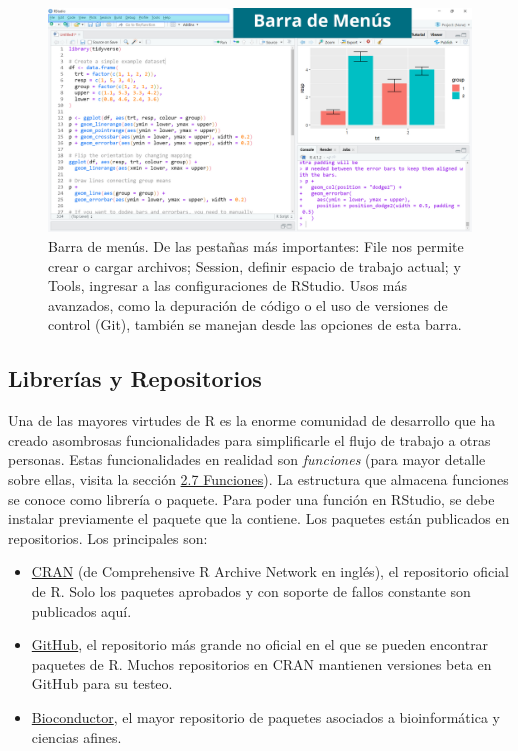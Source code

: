 \documentclass[
]{article}
\theoremstyle{definition}
\theoremstyle{definition}
\theoremstyle{definition}
\theoremstyle{definition}
\theoremstyle{remark}
\begin{document}
\begin{figure}

{\centering \includegraphics[width=1\linewidth]{figs/screenshots/Slide5} 

}

\caption{Barra de menús. De las pestañas más importantes: File nos permite crear o cargar archivos; Session, definir espacio de trabajo actual; y Tools, ingresar a las configuraciones de RStudio. Usos más avanzados, como la depuración de código o el uso de versiones de control (Git), también se manejan desde las opciones de esta barra.}\label{fig:figura18}
\end{figure}

\hypertarget{libreruxedas-y-repositorios}{%
\subsection{Librerías y Repositorios}\label{libreruxedas-y-repositorios}}

Una de las mayores virtudes de R es la enorme comunidad de desarrollo que ha creado asombrosas funcionalidades para simplificarle el flujo de trabajo a otras personas. Estas funcionalidades en realidad son \emph{funciones} (para mayor detalle sobre ellas, visita la sección \protect\hyperlink{funciones}{2.7 Funciones}). La estructura que almacena funciones se conoce como librería o paquete. Para poder una función en RStudio, se debe instalar previamente el paquete que la contiene. Los paquetes están publicados en repositorios. Los principales son:

\begin{itemize}
\item
  \href{https://cran.r-project.org/}{CRAN} (de Comprehensive R Archive Network en inglés), el repositorio oficial de R. Solo los paquetes aprobados y con soporte de fallos constante son publicados aquí.
\item
  \href{https://github.com/}{GitHub}, el repositorio más grande no oficial en el que se pueden encontrar paquetes de R. Muchos repositorios en CRAN mantienen versiones beta en GitHub para su testeo.
\item
  \href{https://www.bioconductor.org/}{Bioconductor}, el mayor repositorio de paquetes asociados a bioinformática y ciencias afines.
\end{itemize}
\end{document}
